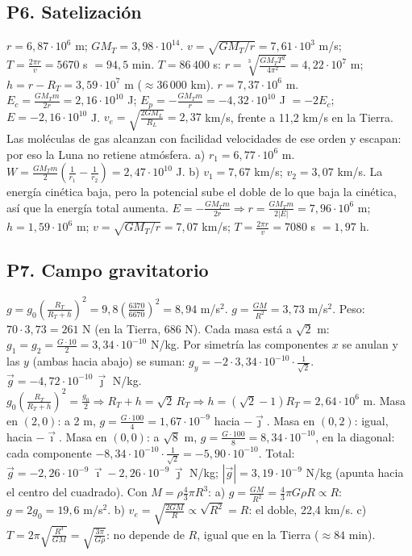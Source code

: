 \documentclass[11pt,a4paper]{article}
\newcommand{\ii}{\vec{\imath}}
\newcommand{\jj}{\vec{\jmath}}
\begin{document}
\subsection*{P6. Satelización}
\begin{enumerate}[leftmargin=1.4cm,itemsep=4pt]
 $r=6{,}87\cdot10^6$ m; $GM_T=3{,}98\cdot10^{14}$. $v=\sqrt{GM_T/r}=7{,}61\cdot10^3$ m/s; $T=\frac{2\pi r}{v}=5670$ s $=94{,}5$ min.
 $T=86\,400$ s: $r=\sqrt[3]{\frac{GM_TT^2}{4\pi^2}}=4{,}22\cdot10^7$ m; $h=r-R_T=3{,}59\cdot10^7$ m ($\approx36\,000$ km).
 $r=7{,}37\cdot10^6$ m. $E_c=\frac{GM_Tm}{2r}=2{,}16\cdot10^{10}$ J; $E_p=-\frac{GM_Tm}{r}=-4{,}32\cdot10^{10}$ J $=-2E_c$; $E=-2{,}16\cdot10^{10}$ J.
 $v_e=\sqrt{\frac{2GM_L}{R_L}}=2{,}37$ km/s, frente a 11,2 km/s en la Tierra. Las moléculas de gas alcanzan con facilidad velocidades de ese orden y escapan: por eso la Luna no retiene atmósfera.
 a) $r_1=6{,}77\cdot10^6$ m. $W=\frac{GM_Tm}{2}\left(\frac1{r_1}-\frac1{r_2}\right)=2{,}47\cdot10^{10}$ J. b) $v_1=7{,}67$ km/s; $v_2=3{,}07$ km/s. La energía cinética baja, pero la potencial sube el doble de lo que baja la cinética, así que la energía total aumenta.
 $E=-\frac{GM_Tm}{2r}\Rightarrow r=\frac{GM_Tm}{2|E|}=7{,}96\cdot10^6$ m; $h=1{,}59\cdot10^6$ m; $v=\sqrt{GM_T/r}=7{,}07$ km/s; $T=\frac{2\pi r}{v}=7080$ s $=1{,}97$ h.
\end{enumerate}

\subsection*{P7. Campo gravitatorio}
\begin{enumerate}[leftmargin=1.4cm,itemsep=4pt]
 $g=g_0\left(\frac{R_T}{R_T+h}\right)^2=9{,}8\left(\frac{6370}{6670}\right)^2=8{,}94$ m/s$^2$.
 $g=\frac{GM}{R^2}=3{,}73$ m/s$^2$. Peso: $70\cdot3{,}73=261$ N (en la Tierra, 686 N).
 Cada masa está a $\sqrt2$ m: $g_1=g_2=\frac{G\cdot10}{2}=3{,}34\cdot10^{-10}$ N/kg. Por simetría las componentes $x$ se anulan y las $y$ (ambas hacia abajo) se suman: $g_y=-2\cdot3{,}34\cdot10^{-10}\cdot\frac{1}{\sqrt2}$. $\vec g=-4{,}72\cdot10^{-10}\,\jj$ N/kg.
 $g_0\left(\frac{R_T}{R_T+h}\right)^2=\frac{g_0}{2}\Rightarrow R_T+h=\sqrt2\,R_T\Rightarrow h=(\sqrt2-1)R_T=2{,}64\cdot10^6$ m.
 Masa en $(2,0)$: a 2 m, $g=\frac{G\cdot100}{4}=1{,}67\cdot10^{-9}$ hacia $-\jj$. Masa en $(0,2)$: igual, hacia $-\ii$. Masa en $(0,0)$: a $\sqrt8$ m, $g=\frac{G\cdot100}{8}=8{,}34\cdot10^{-10}$, en la diagonal: cada componente $-8{,}34\cdot10^{-10}\cdot\frac{1}{\sqrt2}=-5{,}90\cdot10^{-10}$. Total: $\vec g=-2{,}26\cdot10^{-9}\,\ii-2{,}26\cdot10^{-9}\,\jj$ N/kg; $|\vec g|=3{,}19\cdot10^{-9}$ N/kg (apunta hacia el centro del cuadrado).
 Con $M=\rho\frac43\pi R^3$: a) $g=\frac{GM}{R^2}=\frac43\pi G\rho R\propto R$: $g=2g_0=19{,}6$ m/s$^2$. b) $v_e=\sqrt{\frac{2GM}{R}}\propto\sqrt{R^2}=R$: el doble, 22,4 km/s. c) $T=2\pi\sqrt{\frac{R^3}{GM}}=\sqrt{\frac{3\pi}{G\rho}}$: no depende de $R$, igual que en la Tierra ($\approx84$ min).
\end{enumerate}
\normalsize
\end{document}
